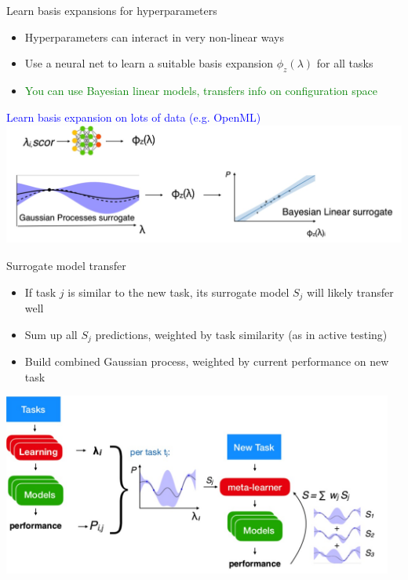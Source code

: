 \documentclass[aspectratio=169,t,handout,xcolor={usenames,dvipsnames}]{beamer}
\begin{document}
\begin{frame}{Learn basis expansions for hyperparameters}

    \begin{itemize}
        \item Hyperparameters can interact in very non-linear ways
        \item Use a neural net to learn a suitable basis expansion $\phi _z(\lambda)$ for all tasks
        \item \textcolor{green}{You can use Bayesian linear models, transfers info on configuration space}
    \end{itemize}
\small \textcolor{blue}{Learn basis expansion on lots of data (e.g. OpenML)}
\centering\includegraphics[height=4cm]{image/Jietu20220328-202530.jpg}

\end{frame}

\begin{frame}{Surrogate model transfer}
    \begin{itemize}
        \item If task $j$ is similar to the new task, its surrogate model $S_j$ will likely transfer well
        \item Sum up all $S_j$ predictions, weighted by task similarity (as in active testing)
        \item Build combined Gaussian process, weighted by current performance on new task
    \end{itemize}
\centering\includegraphics[height=6cm]{image/Jietu20220328-202917.jpg}

\end{frame}
\end{document}
